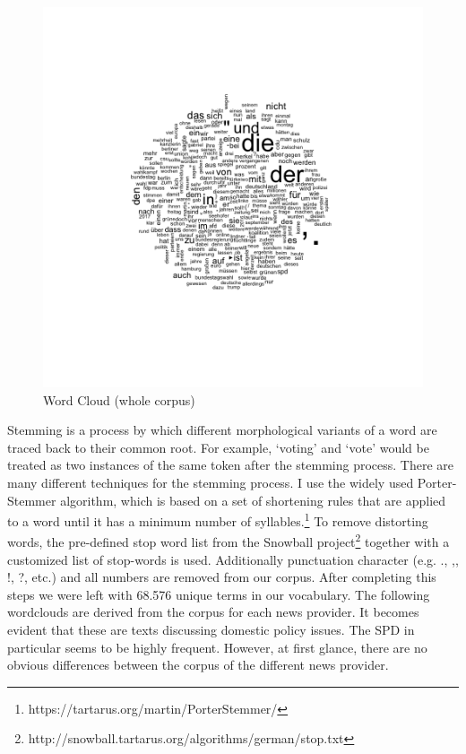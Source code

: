 \documentclass[12pt,a4paper,notitlepage]{article}
\begin{document}
\begin{figure}[H]
	\begin{center}
		\includegraphics[width=\textwidth]{../figs/wordcloud.png}
		\caption{Word Cloud (whole corpus)}
		\label{fig_wordcloud1}
	\end{center}
\end{figure}

Stemming is a process by which different morphological variants of a word are traced back to their common root. For example, ‘voting’ and ‘vote’ would be treated as two instances of the same token after the stemming process. There are many different techniques for the stemming process. I use the widely used Porter-Stemmer algorithm, which is based on a set of shortening rules that are applied to a word until it has a minimum number of syllables.\footnote{https://tartarus.org/martin/PorterStemmer/} To remove distorting words, the pre-defined stop word list from the Snowball project\footnote{http://snowball.tartarus.org/algorithms/german/stop.txt} together with a customized list of stop-words is used. Additionally punctuation character (e.g. ., ,, !, ?, etc.) and all numbers are removed from our corpus. After completing this steps we were left with 68.576 unique terms in our vocabulary. The following wordclouds are derived from the corpus for each news provider. It becomes evident that these are texts discussing domestic policy issues. The SPD in particular seems to be highly frequent. However, at first glance, there are no obvious differences between the corpus of the different news provider.  
\end{document}
